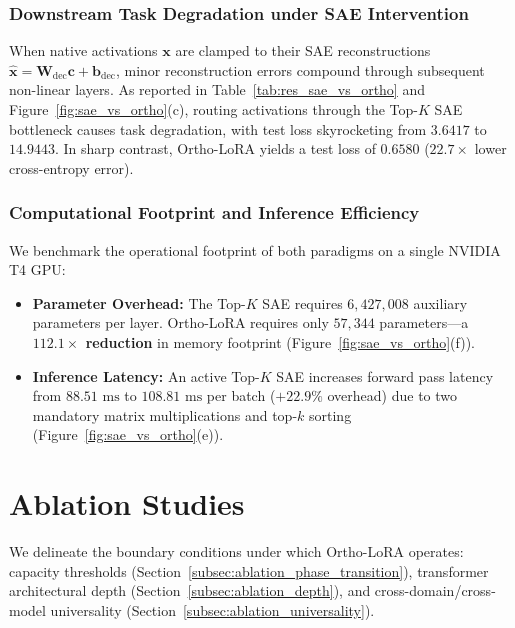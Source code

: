 \documentclass[10pt,twocolumn,letterpaper]{article}
\begin{document}
\subsubsection{Downstream Task Degradation under SAE Intervention}
When native activations $\bm{x}$ are clamped to their SAE reconstructions $\hat{\bm{x}} = \bm{W}_{\text{dec}}\bm{c} + \bm{b}_{\text{dec}}$, minor reconstruction errors compound through subsequent non-linear layers. As reported in Table~\ref{tab:res_sae_vs_ortho} and Figure~\ref{fig:sae_vs_ortho}(c), routing activations through the Top-$K$ SAE bottleneck causes task degradation, with test loss skyrocketing from $3.6417$ to \textbf{$14.9443$}. In sharp contrast, Ortho-LoRA yields a test loss of \textbf{$0.6580$} ($22.7\times$ lower cross-entropy error).

\subsubsection{Computational Footprint and Inference Efficiency}
We benchmark the operational footprint of both paradigms on a single NVIDIA T4 GPU:
\begin{itemize}
    \item \textbf{Parameter Overhead:} The Top-$K$ SAE requires $6,427,008$ auxiliary parameters per layer. Ortho-LoRA requires only $57,344$ parameters---a \textbf{$112.1\times$ reduction} in memory footprint (Figure~\ref{fig:sae_vs_ortho}(f)).
    \item \textbf{Inference Latency:} An active Top-$K$ SAE increases forward pass latency from $88.51\text{ ms}$ to $108.81\text{ ms}$ per batch ($+22.9\%$ overhead) due to two mandatory matrix multiplications and top-$k$ sorting (Figure~\ref{fig:sae_vs_ortho}(e)).
\end{itemize}

\section{Ablation Studies}
\label{sec:ablations}

We delineate the boundary conditions under which Ortho-LoRA operates: capacity thresholds (Section~\ref{subsec:ablation_phase_transition}), transformer architectural depth (Section~\ref{subsec:ablation_depth}), and cross-domain/cross-model universality (Section~\ref{subsec:ablation_universality}).
\end{document}
